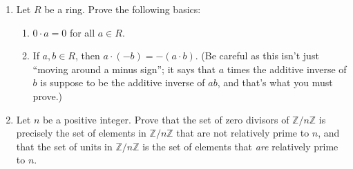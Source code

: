 \documentclass[12pt]{article}
\newcommand{\bbZ}{\mathbb{Z}}
\newcommand{\solution}[1]{\textcolor{red}{#1}}
\renewcommand{\solution}[1]{}
\begin{document}
\pagestyle{fancy}


\begin{enumerate}
\item Let $R$ be a ring. Prove the following basics:
  \begin{enumerate}
  \item $0\cdot a=0$ for all $a\in R$. 
\solution{Consider $0a+0a=(0+0)a=0a$. Taking the additive inverse of
  $0a$ on both sides gives $0a+0=0$ or $0a=0$. }
  \item If $a,b\in R$, then $a\cdot (-b)=-(a\cdot b)$. (Be careful as this isn't just
    ``moving around a minus sign''; it says that $a$ times the
    additive inverse of $b$ is suppose to be the additive inverse of
    $ab$, and that's what you must prove.)
\solution{$a(-b)+ab = a(-b+b)=a0=0$. Hence, $-ab=a(-b)$. }
  \end{enumerate}
\item  Let $n$ be a positive integer. Prove that the set of zero
  divisors of $\bbZ/n\bbZ$ is precisely the set of elements in
  $\bbZ/n\bbZ$ that are not relatively prime to $n$, and that the set of
  units in $\bbZ/n\bbZ$ is the set of elements that \emph{are}
  relatively prime to $n$.
\solution{
Suppose that $z\in \{1,\dotsc, n-1\}$ is an integer with
$\gcd(z,n)=d\neq 1$. Then $\operatorname{lcm}(z,n)=\frac{zn}{d}=z
\frac{n}{d}$. By definition of $d$, $\frac{n}{d}$ is an integer that
is \emph{strictly} less than $n$ since $d\neq 1$. Thus,
\begin{align*}
  [z][n/d] &= [zn/d]\\
  &= [(z/d) n]
\end{align*}
which is equal to zero since $z/d$ is an integer. Hence, if $z$ and
$n$ are not coprime, $z$ is a zero divisor. 
Now suppose that $[z]\in \bbZ/n\bbZ$ is a zero divisor. Then there is a
non-zero element $[b]\in \bbZ/n\bbZ$ such that $[bz]=[0]$ in
$\bbZ/n\bbZ$. Without loss of generality, we may assume $z,b\in
\{1,\dotsc, n-1\}$. Hence, $bz$ is a multiple of $n$, so $bz=kn$ for
some integer $k$. But since $b<n$, $zb<zn$. Therefore, the least
common multiple of $z$ and $n$ is less than $zn$. This implies that
$b$ and $n$ are \emph{not} relatively prime.  }
\solution{Suppose that $[z]\in \bbZ/n\bbZ$ is a unit. Thus, there
  is an element $[a]\in \bbZ/n\bbZ$ such that $[a][z]=[1]$, i.e.,
  $az-1$ is a multiple of $n$. Hence, $az-1=bn$ for some integer
  $b$. Equivalently, $az+bn=1$ for some integers $a$ and $b$. This
  implies that $\gcd(z,n)=1$ (since the smallest positive integer that
  can be written as a $\bbZ$-linear combination of two integers is
}
\end{enumerate}
\end{document}
